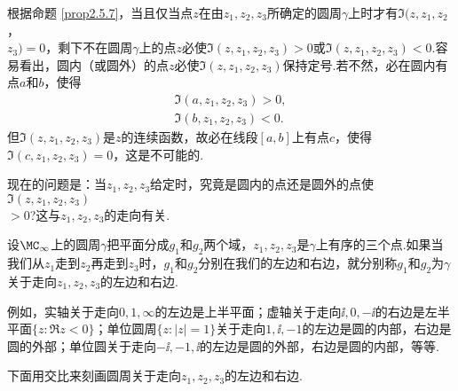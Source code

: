 根据命题 \ref{prop2.5.7}，当且仅当点$z$在由$z_1,z_2,z_3$所确定的圆周$\gamma$上时才有$\Im(z,z_1,z_2$，\\$z_3)=0$，剩下不在圆周$\gamma$上的点$z$必使$\Im(z,z_1,z_2,z_3)>0$或$\Im(z,z_1,z_2,z_3)<0$.容易看出，圆内（或圆外）的点$z$必使$\Im(z,z_1,z_2,z_3)$保持定号.若不然，必在圆内有点$a$和$b$，使得
\begin{gather*}
\Im(a,z_1,z_2,z_3)>0,\\
\Im(b,z_1,z_2,z_3)<0.
\end{gather*}
但$\Im(z,z_1,z_2,z_3)$是$z$的连续函数，故必在线段$[a,b]$上有点$c$，使得$\Im(c,z_1,z_2,z_3)=0$，这是不可能的.

现在的问题是：当$z_1,z_2,z_3$给定时，究竟是圆内的点还是圆外的点使$\Im(z,z_1,z_2,z_3)$\\$>0$?这与$z_1,z_2,z_3$的走向有关.
\begin{definition}\label{def2.5.8}
设$\MC_\infty$上的圆周$\gamma$把平面分成$g_1$和$g_2$两个域，$z_1,z_2,z_3$是$\gamma$上有序的三个点.如果当我们从$z_1$走到$z_2$再走到$z_3$时，$g_1$和$g_2$分别在我们的左边和右边，就分别称$g_1$和$g_2$为$\gamma$关于走向$z_1,z_2,z_3$的左边和右边.
\end{definition}

例如，实轴关于走向$0,1,\infty$的左边是上半平面；虚轴关于走向$\ii,0,-\ii$的右边是左半平面$\{z:\Re z<0\}$；单位圆周$\{z:|z|=1\}$关于走向$1,\ii,-1$的左边是圆的内部，右边是圆的外部；单位圆关于走向$-\ii,-1,\ii$的左边是圆的外部，右边是圆的内部，等等.

下面用交比来刻画圆周关于走向$z_1,z_2,z_3$的左边和右边.

